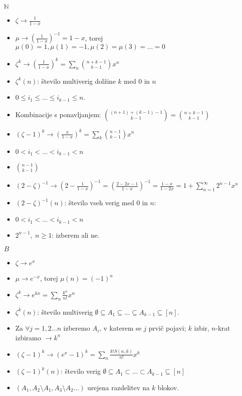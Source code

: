 \documentclass[a4paper, 12pt]{book}
\theoremstyle{definition}
\theoremstyle{remark}
\newcommand{\N}{\mathbb{N}}
\begin{document}
$\N$
\begin{itemize}[label={}]
  \item $\zeta \to \frac{1}{1-x}$
  \item $\mu \to \left(\frac{1}{1-x}\right)^{-1} = 1-x$, torej $\mu(0) = 1, \mu(1) = -1, \mu(2) = \mu(3) = \dots = 0$
  \item $\zeta^k \to \left(\frac{1}{1-x}\right)^k = \sum_n \binom{n+k-1}{k-1} x^n$
  \item $\zeta^k(n)$: število multiverig dolžine $k$ med $0$ in $n$
  \item $0 \leq i_1 \leq \dots \leq i_{k-1} \leq n$.
  \item Kombinacije s ponavljanjem: $\binom{(n+1) + (k-1) - 1}{k-1} = \binom{n+k-1}{k-1}$
  \item $(\zeta-1)^k \to \left(\frac{x}{1-x}\right)^k = \sum_k \binom{n-1}{k-1} x^n$
  \item $0 < i_1 < \dots < i_{k-1} < n$
  \item $\binom{n-1}{k-1}$
  \item $(2-\zeta)^{-1} \to \left(2-\frac{1}{1-x}\right)^{-1} = \left(\frac{2-2x-1}{1-x}\right)^{-1}
    = \frac{1-x}{1-2x} = 1 + \sum_{n=1}^{\infty} 2^{n-1} x^n$
  \item $(2-\zeta)^{-1}(n)$: število vseh verig med 0 in $n$:
  \item $0 < i_1 < \dots < i_{k-1} < n$
  \item $2^{n-1}, \; n \geq 1$: izberem ali ne.
\end{itemize}
$B$
\begin{itemize}[label={}]
  \item $\zeta \to e^x$
  \item $\mu \to e^{-x}$, torej $\mu(n) = (-1)^n$
  \item $\zeta^k \to e^{kx} = \sum_n \frac{k^n}{n!} x^n$
  \item $\zeta^k(n)$: število multiverig $\emptyset \subseteq A_1 \subseteq \dots \subseteq A_{k-1} \subseteq [n]$.
  \item Za $\forall j = 1, 2 \dots n$ izberemo $A_i$, v katerem se $j$ prvič pojavi; $k$ izbir,
    $n$-krat izbiramo $\to k^n$
  \item $(\zeta-1)^k \to (e^x - 1)^k = \sum_n \frac{k! S(n, k)}{n!} x^k$
  \item $(\zeta-1)^k(n)$: število verig $\emptyset \subseteq A_1 \subset \dots \subset A_{k-1} \subseteq [n]$
  \item $(A_1, A_2 \setminus A_1, A_3 \setminus A_2 \dots)$ urejena razdelitev na $k$ blokov.
\end{itemize}
\end{document}
